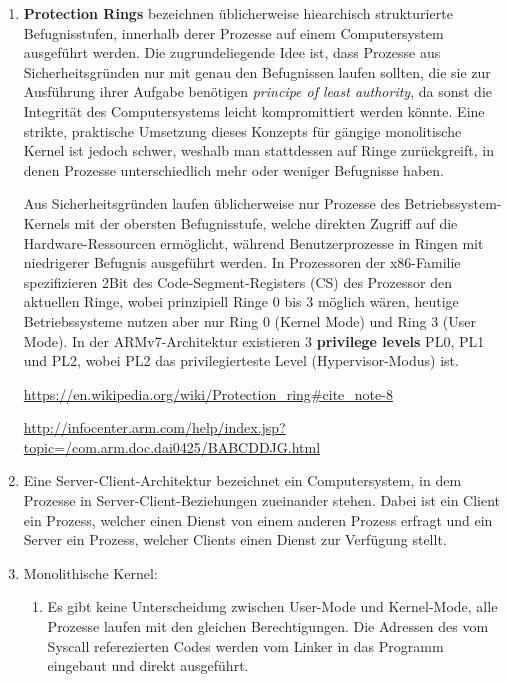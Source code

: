 \documentclass[numbers=noendperiod]{scrartcl}
\begin{document}
\begin{enumerate}[1)]
	\item \textbf{Protection Rings} bezeichnen üblicherweise hiearchisch strukturierte Befugnisstufen, innerhalb derer Prozesse auf einem Computersystem ausgeführt werden. Die zugrundeliegende Idee ist, dass Prozesse aus Sicherheitsgründen nur mit genau den Befugnissen laufen sollten, die sie zur Ausführung ihrer Aufgabe benötigen \textit{principe of least authority}, da sonst die Integrität des Computersystems leicht kompromittiert werden könnte. Eine strikte, praktische Umsetzung dieses Konzepts für gängige monolitische Kernel ist jedoch schwer, weshalb man stattdessen auf Ringe zurückgreift, in denen Prozesse unterschiedlich mehr oder weniger Befugnisse haben.
	
	Aus Sicherheitsgründen laufen üblicherweise nur Prozesse des Betriebssystem-Kernels mit der obersten Befugnisstufe, welche direkten Zugriff auf die Hardware-Ressourcen ermöglicht, während Benutzerprozesse in Ringen mit niedrigerer Befugnis ausgeführt werden. In Prozessoren der x86-Familie spezifizieren 2Bit des Code-Segment-Registers (CS) des Prozessor den aktuellen Ringe, wobei prinzipiell Ringe 0 bis 3 möglich wären, heutige Betriebssysteme nutzen aber nur Ring 0 (Kernel Mode) und Ring 3 (User Mode). In der ARMv7-Architektur existieren 3 \textbf{privilege levels} PL0, PL1 und PL2, wobei PL2 das privilegierteste Level (Hypervisor-Modus) ist.
	
	\url{https://en.wikipedia.org/wiki/Protection_ring#cite_note-8}
	
	\url{http://infocenter.arm.com/help/index.jsp?topic=/com.arm.doc.dai0425/BABCDDJG.html}
	
	\item Eine Server-Client-Architektur bezeichnet ein Computersystem, in dem Prozesse in Server-Client-Beziehungen zueinander stehen. Dabei ist ein Client ein Prozess, welcher einen Dienst von einem anderen Prozess erfragt und ein Server ein Prozess, welcher Clients einen Dienst zur Verfügung stellt.
	
	\item 
		Monolithische Kernel:
		\begin{enumerate}
			\item Es gibt keine Unterscheidung zwischen User-Mode und Kernel-Mode, alle Prozesse laufen mit den gleichen Berechtigungen. Die Adressen des vom Syscall referezierten Codes werden vom Linker in das Programm eingebaut und direkt ausgeführt.
			

\end{enumerate}
\end{enumerate}
\end{document}
